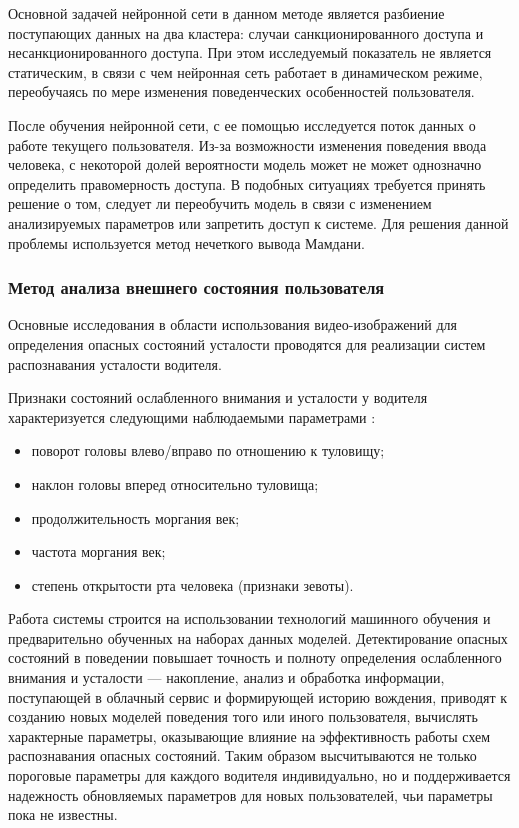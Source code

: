 Основной задачей нейронной сети в данном методе является разбиение поступающих данных на два кластера: случаи санкционированного доступа и несанкционированного доступа. При этом исследуемый показатель не является статическим, в связи с чем нейронная сеть работает в динамическом режиме, переобучаясь по мере изменения поведенческих особенностей пользователя. \cite{neuroFatigue}

После обучения нейронной сети, с ее помощью исследуется поток данных о работе текущего пользователя. Из-за возможности изменения поведения ввода человека, с некоторой долей вероятности модель может не может однозначно определить правомерность доступа. В подобных ситуациях требуется принять решение о том, следует ли переобучить модель в связи с изменением анализируемых параметров или запретить доступ к системе. Для решения данной проблемы используется метод нечеткого вывода Мамдани. \cite{neuroFatigue}

\subsubsection{Метод анализа внешнего состояния пользователя}
Основные исследования в области использования видео-изображений для определения опасных состояний усталости проводятся для реализации систем распознавания усталости водителя.

Признаки состояний ослабленного внимания и усталости у водителя характеризуется следующими наблюдаемыми параметрами \cite{videoMethod}:
\begin{itemize}[leftmargin=1.6\parindent]
\item поворот головы влево/вправо по отношению к туловищу;
\item наклон головы вперед относительно туловища;
\item продолжительность моргания век;
\item частота моргания век;
\item степень открытости рта человека (признаки зевоты).
\end{itemize}

Работа системы строится на использовании технологий машинного обучения и предварительно обученных на наборах данных моделей. Детектирование опасных состояний в поведении повышает точность и полноту определения ослабленного внимания и усталости --- накопление, анализ и обработка информации, поступающей в облачный сервис и формирующей историю вождения, приводят к созданию новых моделей поведения того или иного пользователя, вычислять характерные параметры, оказывающие влияние на эффективность работы схем распознавания опасных состояний. Таким образом высчитываются не только пороговые параметры для каждого водителя индивидуально, но и поддерживается надежность обновляемых параметров для новых пользователей, чьи параметры пока не известны. \cite{videoMethod}

